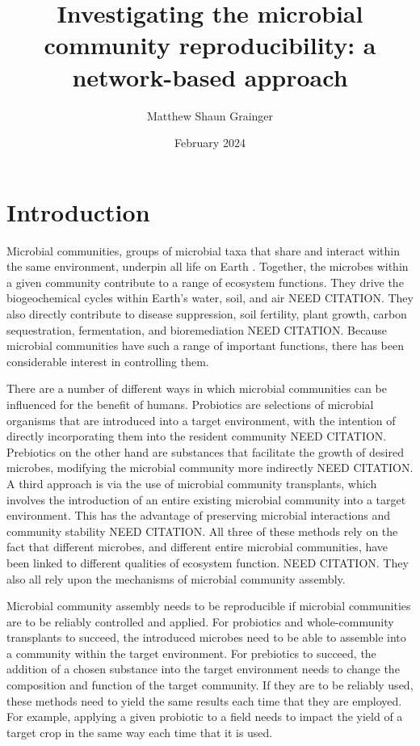 \documentclass{article}
\title{Investigating the microbial community reproducibility: a network-based approach}
\author{Matthew Shaun Grainger}
\date{February 2024}
\begin{document}
\maketitle

\section{Introduction}

Microbial communities, groups of microbial taxa that share and interact within the same environment, underpin all life on Earth \citep{Konopka2009, Widder2016}. Together, the microbes within a given community contribute to a range of ecosystem functions.
They drive the biogeochemical cycles within Earth's water, soil, and air NEED CITATION. They also directly contribute to disease suppression, soil fertility, plant growth, carbon sequestration, fermentation, and bioremediation NEED CITATION. Because microbial communities have such a range of important functions, there has been considerable interest in controlling them.

There are a number of different ways in which microbial communities can be influenced for the benefit of humans. Probiotics are selections of microbial organisms that are introduced into a target environment, with the intention of directly incorporating them into the resident community NEED CITATION. Prebiotics on the other hand are substances that facilitate the growth of desired microbes, modifying the microbial community more indirectly NEED CITATION. A third approach is via the use of microbial community transplants, which involves the introduction of an entire existing microbial community into a target environment. This has the advantage of preserving microbial interactions and community stability NEED CITATION. All three of these methods rely on the fact that different microbes, and different entire microbial communities, have been linked to different qualities of ecosystem function. NEED CITATION. They also all rely upon the mechanisms of microbial community assembly.

Microbial community assembly needs to be reproducible if microbial communities are to be reliably controlled and applied. For probiotics and whole-community transplants to succeed, the introduced microbes need to be able to assemble into a community within the target environment. For prebiotics to succeed, the addition of a chosen substance into the target environment needs to change the composition and function of the target community. If they are to be reliably used, these methods need to yield the same results each time that they are employed. For example, applying a given probiotic to a field needs to impact the yield of a target crop in the same way each time that it is used.
\end{document}
